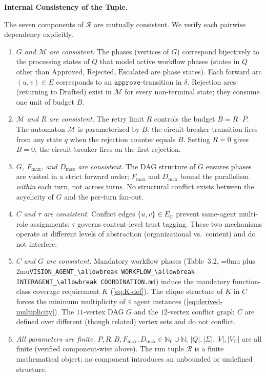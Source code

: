\documentclass[12pt]{article}
\theoremstyle{definition}
\DeclareRobustCommand{\code}[1]{\begingroup\Urlmuskip=0mu plus 2mu\relax\nolinkurl{#1}\endgroup}
\newcommand{\VisionFlow}{\code{VISION\_AGENT\_\allowbreak WORKFLOW\_\allowbreak INTERAGENT\_\allowbreak COORDINATION.md}}
\begin{document}
\medskip
\noindent\textbf{Internal Consistency of the Tuple.}

The seven components of $\mathcal{R}$ are mutually consistent.
We verify each pairwise dependency explicitly.

\begin{enumerate}
  \item \emph{$G$ and $\mathcal{M}$ are consistent.}
        The phases (vertices of $G$) correspond bijectively to the
        processing states of $Q$ that model active workflow phases
        (states in $Q$ other than $\mathrm{Approved}$,
        $\mathrm{Rejected}$, $\mathrm{Escalated}$ are phase states).
        Each forward arc $(u,v) \in E$ corresponds to an
        $\mathtt{approve}$-transition in $\delta$.
        Rejection arcs (returning to $\mathrm{Drafted}$) exist in
        $\mathcal{M}$ for every non-terminal state; they consume one
        unit of budget $B$.

  \item \emph{$\mathcal{M}$ and $R$ are consistent.}
        The retry limit $R$ controls the budget $B = R \cdot P$.
        The automaton $\mathcal{M}$ is parameterized by $B$:
        the circuit-breaker transition fires from any state $q$ when
        the rejection counter equals $B$.  Setting $R = 0$ gives
        $B = 0$; the circuit-breaker fires on the first rejection.

  \item \emph{$G$, $F_{\max}$, and $D_{\max}$ are consistent.}
        The DAG structure of $G$ ensures phases are visited in a
        strict forward order; $F_{\max}$ and $D_{\max}$ bound the
        parallelism \emph{within} each turn, not across turns.  No
        structural conflict exists between the acyclicity of $G$ and
        the per-turn fan-out.

  \item \emph{$C$ and $\tau$ are consistent.}
        Conflict edges $\{u,v\} \in E_C$ prevent same-agent
        multi-role assignments; $\tau$ governs content-level trust
        tagging.  These two mechanisms operate at different levels
        of abstraction (organizational vs.\ content) and do not
        interfere.

  \item \emph{$C$ and $G$ are consistent.}
        Mandatory workflow phases (Table~3.2, \VisionFlow{})
        induce the mandatory function-class coverage requirement $K$
        (\eqref{eq:K-def}).  The clique structure of $K$ in $C$ forces
        the minimum multiplicity of $4$ agent instances
        (\eqref{eq:derived-multiplicity}).  The $11$-vertex DAG $G$
        and the $12$-vertex conflict graph $C$ are defined over
        different (though related) vertex sets and do not conflict.

  \item \emph{All parameters are finite.}
        $P, R, B, F_{\max}, D_{\max} \in \mathbb{N}_0 \cup \mathbb{N}$;
        $|Q|, |\Sigma|, |V|, |V_C|$ are all finite (verified
        component-wise above).  The run tuple $\mathcal{R}$ is a
        finite mathematical object; no component introduces an
        unbounded or undefined structure.
\end{enumerate}
\end{document}
